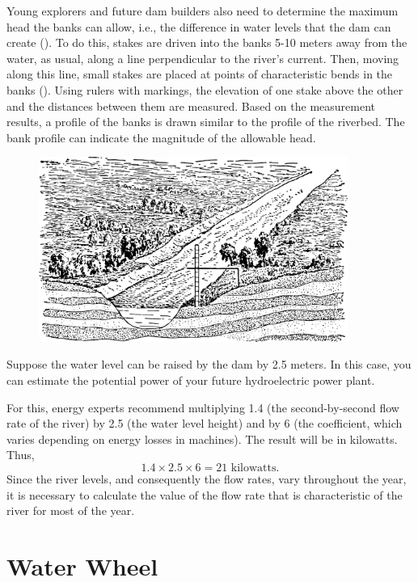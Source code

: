 Young explorers and future dam builders also need to determine the maximum head the banks can allow, i.e., the difference in water levels that the dam can create (). To do this, stakes are driven into the banks 5-10 meters away from the water, as usual, along a line perpendicular to the river's current. Then, moving along this line, small stakes are placed at points of characteristic bends in the banks (). Using rulers with markings, the elevation of one stake above the other and the distances between them are measured. Based on the measurement results, a profile of the banks is drawn similar to the profile of the riverbed. The bank profile can indicate the magnitude of the allowable head.

\begin{figure}[h!]
\centering
\includegraphics[width=0.9\textwidth]{figures/ch-02/fig-044.pdf}
\end{figure}

Suppose the water level can be raised by the dam by 2.5 meters. In this case, you can estimate the potential power of your future hydroelectric power plant.

For this, energy experts recommend multiplying 1.4 (the second-by-second flow rate of the river) by 2.5 (the water level height) and by 6 (the coefficient, which varies depending on energy losses in machines). The result will be in kilowatts. Thus,
\begin{equation*}%
1.4 \times 2.5 \times 6 = 21\,\, \text{kilowatts}.
\end{equation*}
Since the river levels, and consequently the flow rates, vary throughout the year, it is necessary to calculate the value of the flow rate that is characteristic of the river for most of the year.

\section{Water Wheel}
\label{sec-2.09}

